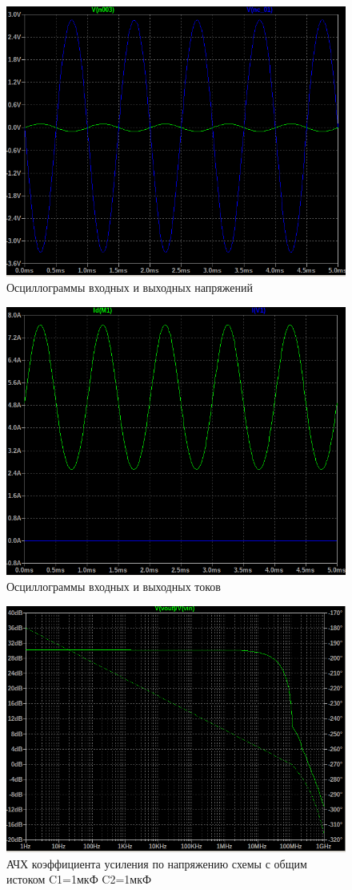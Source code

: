 \begin{figure}[H]
    \centering
    \includegraphics[width=0.8\linewidth]{figs/гарм.png}
    \caption{Осциллограммы входных и выходных напряжений}
    \label{fig:гарм}
\end{figure}

\begin{figure}[H]
    \centering
    \includegraphics[width=0.8\linewidth]{figs/гарм_ток.png}
    \caption{Осциллограммы входных и выходных токов}
    \label{fig:гарм_ток}
\end{figure}

\begin{figure}[H]
    \centering
    \includegraphics[width=0.8\linewidth]{figs/ачх_c1_1m_c2_1u.png}
    \caption{АЧХ коэффициента усиления по напряжению схемы с общим истоком C1=1мкФ C2=1мкФ}
    \label{fig:ачх1}
\end{figure}

